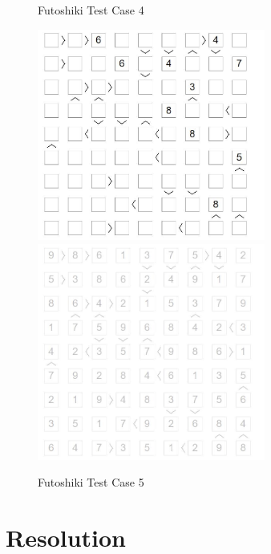 ﻿\documentclass[a4paper, 11pt]{article}
\begin{document}
\begin{enumerate}
\begin{figure}[htbp]
    \caption{Futoshiki Test Case 4}
    \label{fig:case44}
  \end{figure}
        \begin{figure}[htbp]
    \centering
    \includegraphics[width=7.5cm]{Pic/f5}
    \qquad
    \includegraphics[width=7.5cm]{Pic/f5s}
    \caption{Futoshiki Test Case 5}
    \label{fig:case55}
  \end{figure}

\end{enumerate}


\section{Resolution}
\end{document}
